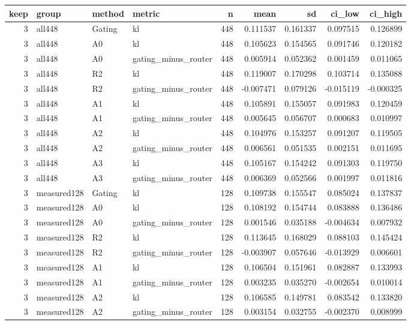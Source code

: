 \begin{tabular}{rlllrrrrr}
\toprule
keep & group & method & metric & n & mean & sd & ci_low & ci_high \\
\midrule
3 & all448 & Gating & kl & 448 & 0.111537 & 0.161337 & 0.097515 & 0.126899 \\
3 & all448 & A0 & kl & 448 & 0.105623 & 0.154565 & 0.091746 & 0.120182 \\
3 & all448 & A0 & gating_minus_router & 448 & 0.005914 & 0.052362 & 0.001459 & 0.011065 \\
3 & all448 & R2 & kl & 448 & 0.119007 & 0.170298 & 0.103714 & 0.135088 \\
3 & all448 & R2 & gating_minus_router & 448 & -0.007471 & 0.079126 & -0.015119 & -0.000325 \\
3 & all448 & A1 & kl & 448 & 0.105891 & 0.155057 & 0.091983 & 0.120459 \\
3 & all448 & A1 & gating_minus_router & 448 & 0.005645 & 0.056707 & 0.000683 & 0.010997 \\
3 & all448 & A2 & kl & 448 & 0.104976 & 0.153257 & 0.091207 & 0.119505 \\
3 & all448 & A2 & gating_minus_router & 448 & 0.006561 & 0.051535 & 0.002151 & 0.011695 \\
3 & all448 & A3 & kl & 448 & 0.105167 & 0.154242 & 0.091303 & 0.119750 \\
3 & all448 & A3 & gating_minus_router & 448 & 0.006369 & 0.052566 & 0.001997 & 0.011816 \\
3 & measured128 & Gating & kl & 128 & 0.109738 & 0.155547 & 0.085024 & 0.137837 \\
3 & measured128 & A0 & kl & 128 & 0.108192 & 0.154744 & 0.083888 & 0.136486 \\
3 & measured128 & A0 & gating_minus_router & 128 & 0.001546 & 0.035188 & -0.004634 & 0.007932 \\
3 & measured128 & R2 & kl & 128 & 0.113645 & 0.168029 & 0.088103 & 0.145424 \\
3 & measured128 & R2 & gating_minus_router & 128 & -0.003907 & 0.057646 & -0.013929 & 0.006601 \\
3 & measured128 & A1 & kl & 128 & 0.106504 & 0.151961 & 0.082887 & 0.133993 \\
3 & measured128 & A1 & gating_minus_router & 128 & 0.003235 & 0.035270 & -0.002654 & 0.010014 \\
3 & measured128 & A2 & kl & 128 & 0.106585 & 0.149781 & 0.083542 & 0.133820 \\
3 & measured128 & A2 & gating_minus_router & 128 & 0.003154 & 0.032755 & -0.002370 & 0.008999 \\

\end{tabular}
